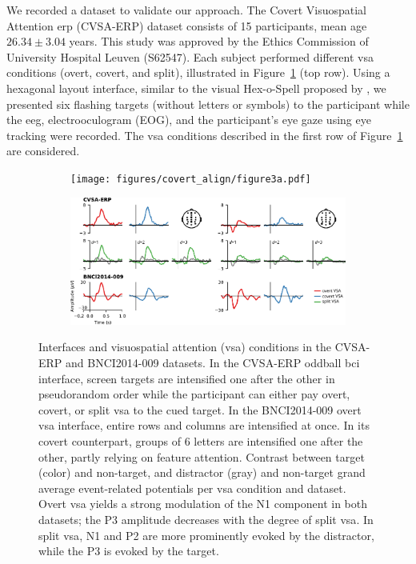 We recorded a dataset to validate our approach.
The Covert Visuospatial Attention \ac{erp} (CVSA-ERP) dataset
consists of 15 participants, mean age $26.34\pm3.04$ years.
This study was approved by the Ethics Commission of University Hospital Leuven
(S62547).
Each subject performed different \ac{vsa} conditions (overt, covert, and split),
illustrated in Figure~\ref{fig:interface} (top row).
Using a hexagonal layout interface, similar to the visual Hex-o-Spell proposed
by \cite{Treder2010}, we presented six flashing targets (without letters or
symbols) to the participant while the \ac{eeg}, electrooculogram (EOG), and the
participant's eye gaze using eye tracking were recorded.
The \ac{vsa} conditions described in the first row of Figure~\ref{fig:interface} are
considered.
\begin{figure}
  \bigskip
	\begin{subfigure}{\linewidth}
		\caption{}
		\label{fig:interface}
		\texttt{[image: figures/covert\_align/figure3a.pdf]}
	\end{subfigure}

	\bigskip
	\bigskip
	\begin{subfigure}{\linewidth}
		\caption{}
		\label{fig:erps}
		\includegraphics[width=\linewidth]{figures/covert_align/figure3b.pdf}
	\end{subfigure}%

  \caption[Stimulation interfaces and evoked \acsp{erp}.]{
		 Interfaces and visuospatial attention (\ac{vsa})
    conditions in the CVSA-ERP and BNCI2014-009 datasets.
		In the CVSA-ERP oddball \ac{bci} interface, screen targets are intensified one after
    the other in pseudorandom order while the participant can either pay overt,
    covert, or split \ac{vsa} to the cued target.
		In the BNCI2014-009 overt \ac{vsa} interface, entire rows and columns are
		intensified at once. In its covert counterpart,
		groups of 6 letters are intensified one after the other, partly relying on
    feature attention.
		 Contrast between target (color) and non-target, and
    distractor (gray) and non-target grand average event-related potentials per \ac{vsa} condition and dataset.
    Overt \ac{vsa} yields a strong modulation of the N1 component in both datasets;
    the P3 amplitude decreases with the degree of split \ac{vsa}.
    In split \ac{vsa}, N1 and P2 are more prominently evoked by the distractor,
    while the P3 is evoked by the target.
	}
\end{figure}

